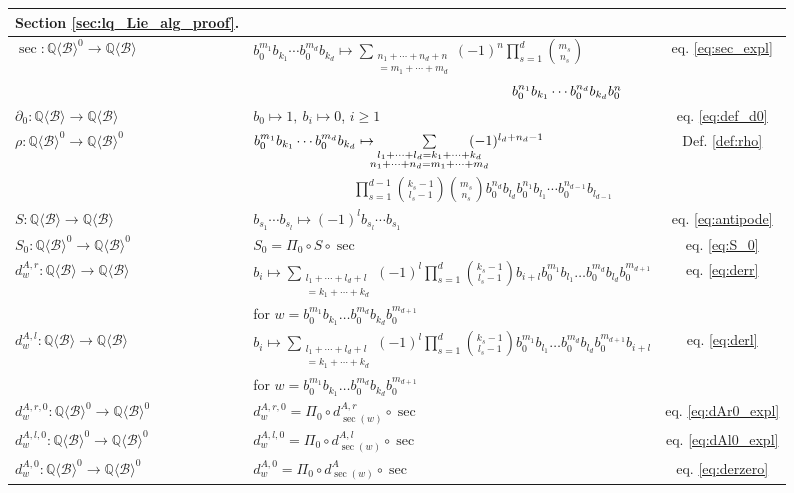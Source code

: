 \documentclass[12pt,reqno]{amsart}
\numberwithin{equation}{section}
\theoremstyle{definition}
\newcommand{\QQ}{\mathbb{Q}}
\newcommand{\B}{\mathcal{B}}
\newcommand{\QB}{\QQ\langle \B\rangle}
\newcommand{\der}[1]{d_{#1}^A}
\newcommand{\derr}[1]{d_{#1}^{A,r}}
\newcommand{\derl}[1]{d_{#1}^{A,l}}
\newcommand{\derzero}[1]{d_{#1}^{A,0}}
\newcommand{\derrzero}[1]{d_{#1}^{A,r,0}}
\newcommand{\derlzero}[1]{d_{#1}^{A,l,0}}
\newcommand{\pizero}{\Pi_0}
\begin{document}
\begin{table}[H]
\begin{tabular}{p{4.4cm}p{9.5cm}c}
\textbf{Section \ref{sec:lq_Lie_alg_proof}.} & & \\ \hline
$\sec:\QB^0\to\QB$ & $b_0^{m_1}b_{k_1}\cdots b_0^{m_d}b_{k_d}\mapsto\sum\limits_{\substack{n_1+\cdots+n_d+n \\ =m_1+\cdots+m_d}} (-1)^n\prod\limits_{s=1}^d\binom{m_s}{n_s}$ & eq. \eqref{eq:sec_expl} \\
& $\hspace{6.5cm}b_0^{n_1}b_{k_1}\cdots b_0^{n_d}b_{k_d}b_0^n$ & \\
$\partial_0:\QB\to\QB$ & $b_0\mapsto 1,\ b_i\mapsto0$, $i\geq1$ & eq. \eqref{eq:def_d0} \\
$\rho:\QB^0\to\QB^0$ & $b_0^{m_1}b_{k_1}\cdots b_0^{m_d}b_{k_d}\mapsto\hspace{-0.2cm}\sum\limits_{\substack{l_1+\cdots+l_d=k_1+\cdots+k_d \\ n_1+\cdots+n_d=m_1+\cdots+m_d}} \hspace{-0.5cm} (-1)^{l_d+n_d-1}$ & Def. \ref{def:rho} \\ & $\hspace{3cm}\prod\limits_{s=1}^{d-1} \binom{k_s-1}{l_s-1}\binom{m_s}{n_s}b_0^{n_d}b_{l_d}b_0^{n_1}b_{l_1}\cdots b_0^{n_{d-1}}b_{l_{d-1}}$ & \\
$S:\QB\to \QB$ & $b_{s_1}\cdots b_{s_l}\mapsto (-1)^l b_{s_l}\cdots b_{s_1}$ & eq. \eqref{eq:antipode} \\
$S_0:\QB^0\to\QB^0$ & $S_0=\pizero\circ S\circ \sec$ & eq. \eqref{eq:S_0} \\
$\derr{w}:\QB\to\QB$ & $b_i\mapsto\sum\limits_{\substack{l_1+\cdots+l_d+l \\ =k_1+\cdots+k_d}}(-1)^l\prod\limits_{s=1}^d \binom{k_s-1}{l_s-1} b_{i+l}b_0^{m_1}b_{l_1}\dots b_0^{m_d}b_{l_d}b_0^{m_{d+1}}$ & eq. \eqref{eq:derr} \\
& for $w=b_0^{m_1}b_{k_1}\dots b_0^{m_d}b_{k_d}b_0^{m_{d+1}}$ & \\
$\derl{w}:\QB\to\QB$ & $b_i\mapsto\sum\limits_{\substack{l_1+\cdots+l_d+l \\ =k_1+\cdots+k_d}}(-1)^l\prod\limits_{s=1}^d \binom{k_s-1}{l_s-1} b_0^{m_1}b_{l_1}\dots b_0^{m_d}b_{l_d}b_0^{m_{d+1}}b_{i+l}$ & eq. \eqref{eq:derl} \\
& for $w=b_0^{m_1}b_{k_1}\dots b_0^{m_d}b_{k_d}b_0^{m_{d+1}}$ & \\
$\derrzero{w}:\QB^0\to\QB^0$ & $\derrzero{w}=\pizero\circ \derr{\sec(w)}\circ\sec$ & eq. \eqref{eq:dAr0_expl} \\
$\derlzero{w}:\QB^0\to\QB^0$ & $\derlzero{w}=\pizero\circ \derl{\sec(w)}\circ\sec$ & eq. \eqref{eq:dAl0_expl} \\
$\derzero{w}:\QB^0\to\QB^0$ & $\derzero{w}=\pizero\circ \der{\sec(w)}\circ\sec$ & eq. \eqref{eq:derzero} 
\end{tabular} 
\end{table}
\end{document}
